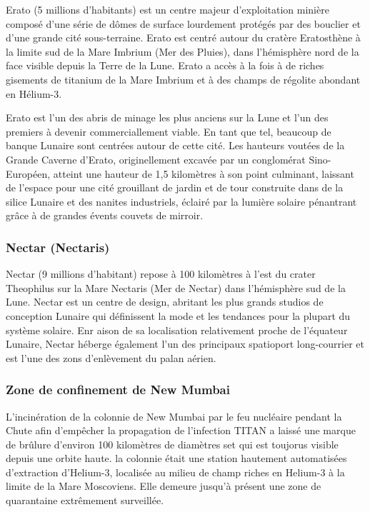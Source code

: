 Erato (5 millions d'habitants) est un centre majeur d'exploitation minière composé d'une série de dômes de surface lourdement protégés par des bouclier et d'une grande cité sous-terraine. Erato est centré autour du cratère Eratosthène à la limite sud de la Mare Imbrium (Mer des Pluies), dans l'hémisphère nord de la face visible depuis la Terre de la Lune. Erato a accès à la fois à de riches gisements de titanium de la Mare Imbrium et à des champs de régolite abondant en Hélium-3. 

Erato est l'un des abris de minage les plus anciens sur la Lune et l'un des premiers à devenir commerciallement viable. En tant que tel, beaucoup de banque Lunaire sont centrées autour de cette cité. Les hauteurs voutées de la Grande Caverne d'Erato, originellement excavée par un conglomérat Sino-Européen, atteint une hauteur de 1,5 kilomètres à son point culminant, laissant de l'espace pour une cité grouillant de jardin et de tour construite dans de la silice Lunaire et des nanites industriels, éclairé par la lumière solaire pénantrant grâce à de grandes évents couvets de mirroir. 

\subsubsection{Nectar (Nectaris)} \label{sec:nectar-nectaris} 

Nectar (9 millions d'habitant) repose à 100 kilomètres à l'est du crater Theophilus sur la Mare Nectaris (Mer de Nectar) dans l'hémisphère sud de la Lune. Nectar est un centre de design, abritant les plus grands studios de conception Lunaire qui définissent la mode et les tendances pour la plupart du système solaire. Enr aison de sa localisation relativement proche de l'équateur Lunaire, Nectar héberge également l'un des principaux spatioport long-courrier et est l'une des zons d'enlèvement du palan aérien. 

\subsubsection{Zone de confinement de New Mumbai} \label{sec:new-mumb-cont} 

L'incinération de la colonnie de New Mumbai par le feu nucléaire pendant la Chute afin d'empêcher la propagation de l'infection TITAN a laissé une marque de brûlure d'environ 100 kilomètres de diamètres set qui est toujorus visible depuis une orbite haute. la colonnie était une station hautement automatisées d'extraction d'Helium-3, localisée au milieu de champ riches en Helium-3 à la limite de la Mare Moscoviens. Elle demeure jusqu'à présent une zone de quarantaine extrêmement surveillée. 

